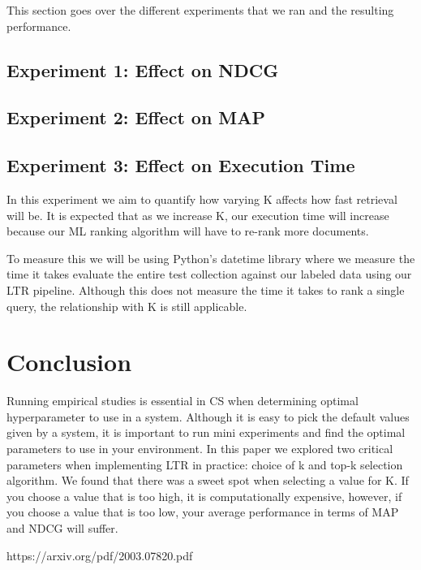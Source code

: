 \documentclass[letterpaper,12pt]{article}
\begin{document}
This section goes over the different experiments that we ran and the resulting performance.

\subsection{Experiment 1: Effect on NDCG}

\subsection{Experiment 2: Effect on MAP}

\subsection{Experiment 3: Effect on Execution Time}

In this experiment we aim to quantify how varying K affects how fast retrieval will be.
It is expected that as we increase K, our execution time will increase because our ML ranking algorithm will have to re-rank more documents.

To measure this we will be using Python's datetime library where we measure the time it takes evaluate the entire test collection against our labeled data using our LTR pipeline.
Although this does not measure the time it takes to rank a single query, the relationship with K is still applicable.




\section{Conclusion}

Running empirical studies is essential in CS when determining optimal hyperparameter to use in a system.
Although it is easy to pick the default values given by a system, it is important to run mini experiments and find the optimal parameters to use in your environment.
In this paper we explored two critical parameters when implementing LTR in practice: choice of k and top-k selection algorithm.
We found that there was a sweet spot when selecting a value for K.
If you choose a value that is too high, it is computationally expensive, however, if you choose a value that is too low, your average performance in terms of MAP and NDCG will suffer.


\newpage



https://arxiv.org/pdf/2003.07820.pdf
\end{document}
